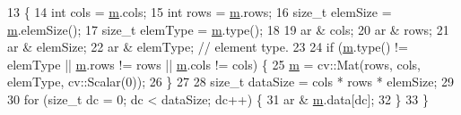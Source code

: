 \begin{DoxyCode}
13                                                                                   \{
14             \textcolor{keywordtype}{int} cols = \hyperlink{_gen_blob_8m_ab3cd915d758008bd19d0f2428fbb354a}{m}.cols;
15             \textcolor{keywordtype}{int} rows = \hyperlink{_gen_blob_8m_ab3cd915d758008bd19d0f2428fbb354a}{m}.rows;
16             \textcolor{keywordtype}{size\_t} elemSize = \hyperlink{_gen_blob_8m_ab3cd915d758008bd19d0f2428fbb354a}{m}.elemSize();
17             \textcolor{keywordtype}{size\_t} elemType = \hyperlink{_gen_blob_8m_ab3cd915d758008bd19d0f2428fbb354a}{m}.type();
18 
19             ar & cols;
20             ar & rows;
21             ar & elemSize;
22             ar & elemType; \textcolor{comment}{// element type.}
23 
24             \textcolor{keywordflow}{if} (\hyperlink{_gen_blob_8m_ab3cd915d758008bd19d0f2428fbb354a}{m}.type() != elemType || \hyperlink{_gen_blob_8m_ab3cd915d758008bd19d0f2428fbb354a}{m}.rows != rows || \hyperlink{_gen_blob_8m_ab3cd915d758008bd19d0f2428fbb354a}{m}.cols != cols) \{
25                 \hyperlink{_gen_blob_8m_ab3cd915d758008bd19d0f2428fbb354a}{m} = cv::Mat(rows, cols, elemType, cv::Scalar(0));
26             \}
27 
28             \textcolor{keywordtype}{size\_t} dataSize = cols * rows * elemSize;
29 
30             \textcolor{keywordflow}{for} (\textcolor{keywordtype}{size\_t} dc = 0; dc < dataSize; dc++) \{
31                 ar & \hyperlink{_gen_blob_8m_ab3cd915d758008bd19d0f2428fbb354a}{m}.data[dc];
32             \}
33         \}
\end{DoxyCode}
